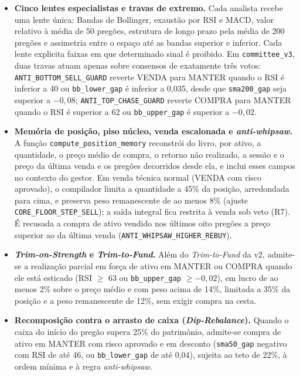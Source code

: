\begin{itemize}
  \item \textbf{Cinco lentes especialistas e travas de extremo.} Cada analista recebe uma lente única: Bandas de Bollinger, exaustão por RSI e MACD, valor relativo à média de 50 pregões, estrutura de longo prazo pela média de 200 pregões e assimetria entre o espaço até as bandas superior e inferior. Cada lente explicita faixas em que determinado sinal é proibido. Em \texttt{committee\_v3}, duas travas atuam apenas sobre consensos de exatamente três votos: \texttt{ANTI\_BOTTOM\_SELL\_GUARD} reverte VENDA para MANTER quando o RSI é inferior a 40 ou \texttt{bb\_lower\_gap} é inferior a 0,035, desde que \texttt{sma200\_gap} seja superior a $-0{,}08$; \texttt{ANTI\_TOP\_CHASE\_GUARD} reverte COMPRA para MANTER quando o RSI é superior a 62 ou \texttt{bb\_upper\_gap} é superior a $-0{,}02$.
  \item \textbf{Memória de posição, piso núcleo, venda escalonada e \textit{anti-whipsaw}.} A função \texttt{compute\_position\_memory} reconstrói do livro, por ativo, a quantidade, o preço médio de compra, o retorno não realizado, a sessão e o preço da última venda e os pregões decorridos desde ela, e inclui esses campos no contexto do gestor. Em venda técnica normal (VENDA com risco aprovado), o compilador limita a quantidade a 45\% da posição, arredondada para cima, e preserva peso remanescente de ao menos 8\% (ajuste \texttt{CORE\_FLOOR\_STEP\_SELL}); a saída integral fica restrita à venda sob veto (R7). É recusada a compra de ativo vendido nos últimos oito pregões a preço superior ao da última venda (\texttt{ANTI\_WHIPSAW\_HIGHER\_REBUY}).
  \item \textbf{\textit{Trim-on-Strength} e \textit{Trim-to-Fund}.} Além do \textit{Trim-to-Fund} da v2, admite-se a realização parcial em força de ativo em MANTER ou COMPRA quando ele está esticado (RSI $\geq$ 63 ou \texttt{bb\_upper\_gap} $\geq -0{,}02$), em lucro de ao menos 2\% sobre o preço médio e com peso acima de 14\%, limitada a 35\% da posição e a peso remanescente de 12\%, sem exigir compra na cesta.
  \item \textbf{Recomposição contra o arrasto de caixa (\textit{Dip-Rebalance}).} Quando o caixa do início do pregão supera 25\% do patrimônio, admite-se compra de ativo em MANTER com risco aprovado e em desconto (\texttt{sma50\_gap} negativo com RSI de até 46, ou \texttt{bb\_lower\_gap} de até 0,04), sujeita ao teto de 22\%, à ordem mínima e à regra \textit{anti-whipsaw}.
\end{itemize}

